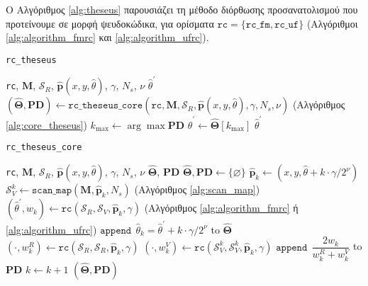 Ο Αλγόριθμος \ref{alg:theseus} παρουσιάζει τη μέθοδο διόρθωσης προσανατολισμού
που προτείνουμε σε μορφή ψευδοκώδικα, για ορίσματα $\texttt{rc} =
\{\texttt{rc\_fm}, \texttt{rc\_uf}\}$ (Αλγόριθμοι \ref{alg:algorithm_fmrc} και
\ref{alg:algorithm_ufrc}).

\begin{algorithm}[!h]
  \caption{\texttt{rc\_theseus}}
  \label{alg:theseus}
  \begin{spacing}{1.5}
  \begin{algorithmic}[1]
    \REQUIRE \texttt{rc}, $\bm{M}$, $\mathcal{S}_R$, $\hat{\bm{p}}(x, y, \hat{\theta})$, $\gamma$, $N_s$, $\nu$
    \ENSURE $\hat{\theta}^\prime$
    \STATE $(\hat{\bm{\Theta}}, \textbf{PD}) \leftarrow \texttt{rc\_theseus\_core}(\texttt{rc}, \bm{M}, \mathcal{S}_R, \hat{\bm{p}}(x, y, \hat{\theta}), \gamma, N_s, \nu)$ \hfill (Αλγόριθμος \ref{alg:core_theseus})
    \STATE $k_{\max} \leftarrow \arg\max\textbf{PD}$
    \STATE $\hat{\theta}^\prime \leftarrow \hat{\bm{\Theta}}[k_{\max}]$
    \RETURN $\hat{\theta}^\prime$
  \end{algorithmic}
  \end{spacing}
\end{algorithm}

\begin{algorithm}[!h]
  \caption{\texttt{rc\_theseus\_core}}
  \label{alg:core_theseus}
  \begin{spacing}{1.5}
  \begin{algorithmic}[1]
    \REQUIRE \texttt{rc}, $\bm{M}$, $\mathcal{S}_R$, $\hat{\bm{p}}(x, y, \hat{\theta})$, $\gamma$, $N_s$, $\nu$
    \ENSURE $\hat{\bm{\Theta}}$, $\textbf{PD}$
    \STATE $\hat{\bm{\Theta}}, \textbf{PD} \leftarrow \{\varnothing\}$
      \STATE $\hat{\bm{p}}_k \leftarrow (x, y, \hat{\theta} + k \cdot \gamma/2^\nu)$
      \STATE $\mathcal{S}_V^k \leftarrow \texttt{scan\_map}(\bm{M}, \hat{\bm{p}}_k, N_s)$ \hfill (Αλγόριθμος \ref{alg:scan_map})
      \STATE $(\hat{\theta}^\prime, w_k) \leftarrow \texttt{rc}(\mathcal{S}_R, \mathcal{S}_V, \hat{\bm{p}}_k, \gamma)$ \hfill (Αλγόριθμος \ref{alg:algorithm_fmrc} ή \ref{alg:algorithm_ufrc})
      \STATE $\texttt{append} \ \ \hat{\theta}_k = \hat{\theta}^\prime + k \cdot \gamma/2^\nu$ to $\hat{\bm{\Theta}}$
      \STATE $(\cdot,w_k^{R}) \leftarrow \texttt{rc}(\mathcal{S}_R, \mathcal{S}_R, \hat{\bm{p}}_k, \gamma)$
      \STATE $(\cdot,w_k^{V}) \leftarrow \texttt{rc}(\mathcal{S}_V^k, \mathcal{S}_V^k, \hat{\bm{p}}_k, \gamma)$
      \STATE $\texttt{append} \ \ \dfrac{2w_k}{w_k^{R} + w_k^{V}}$ to \textbf{PD}
      \STATE $k \leftarrow k + 1$
    \ENDFOR
    \RETURN $(\hat{\bm{\Theta}}, \textbf{PD})$
  \end{algorithmic}
  \end{spacing}
\end{algorithm}

